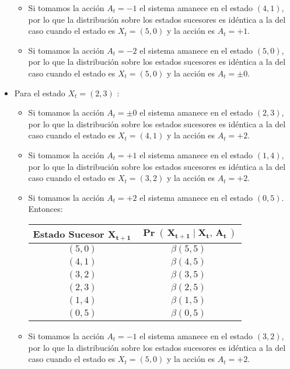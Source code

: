 \documentclass[ a4paper, twoside, 11pt]{article}
\begin{document}
\begin{problem}
\begin{itemize}
\begin{itemize}
\begin{table}[H]
\end{table}
\item Si tomamos la acci\'on $A_t = -1$ el sistema amanece en el estado $(4,1)$, por lo que la distribuci\'on sobre los estados sucesores es id\'entica a la del caso cuando el estado es $X_t = (5,0)$ y la acci\'on es $A_t = +1$. 
\item Si tomamos la acci\'on $A_t = -2$ el sistema amanece en el estado $(5,0)$, por lo que la distribuci\'on sobre los estados sucesores es id\'entica a la del caso cuando el estado es $X_t = (5,0)$ y la acci\'on es $A_t = \pm 0$. 
\end{itemize}
\item Para el estado $X_t = (2,3)$ :
\begin{itemize}
\item Si tomamos la acci\'on $A_t = \pm 0$ el sistema amanece en el estado $(2,3)$, por lo que la distribuci\'on sobre los estados sucesores es id\'entica a la del caso cuando el estado es $X_t = (4,1)$ y la acci\'on es $A_t = +2$. 
\item Si tomamos la acci\'on $A_t = +1$ el sistema amanece en el estado $(1,4)$, por lo que la distribuci\'on sobre los estados sucesores es id\'entica a la del caso cuando el estado es $X_t = (3,2)$ y la acci\'on es $A_t = +2$. 
\item Si tomamos la acci\'on $A_t = +2$ el sistema amanece en el estado $(0,5)$. Entonces: 
\begin{table}[H]
\centering
\begin{tabular}{|c|c|}
\hline
\textbf{Estado Sucesor} $\boldsymbol{X_{t+1}}$
& $\boldsymbol{\Pr( \, X_{t+1} \mid X_t, \, A_t \, )}$ \\ \hline
$(5,0)$ & $\beta(5,5)$ \\ \hline
$(4,1)$ & $\beta(4,5)$ \\ \hline
$(3,2)$ & $\beta(3,5)$ \\ \hline
$(2,3)$ & $\beta(2,5)$ \\ \hline
$(1,4)$ & $\beta(1,5)$ \\ \hline
$(0,5)$ & $\beta(0,5)$ \\ \hline
\end{tabular}
\end{table}
\item Si tomamos la acci\'on $A_t = -1$ el sistema amanece en el estado $(3,2)$, por lo que la distribuci\'on sobre los estados sucesores es id\'entica a la del caso cuando el estado es $X_t = (5,0)$ y la acci\'on es $A_t = +2$. 

\end{itemize}
\end{itemize}
\end{problem}
\end{document}
